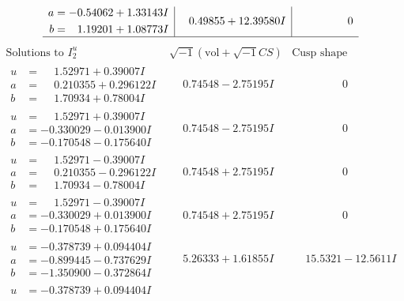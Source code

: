 \documentclass[1p]{elsarticle_modified}
\theoremstyle{definition}
\newcommand{\I}{\sqrt{-1}}
\begin{document}
$$\begin{array}{c|c|c}
\begin{aligned}
a &= -0.54062 + 1.33143 I \\
b &= \phantom{-}1.19201 + 1.08773 I\end{aligned}
 & \phantom{-}0.49855 + 12.39580 I & \phantom{-0.000000 } 0\\
 \hline 
 \end{array}$$\newpage$$\begin{array}{c|c|c}  
\text{Solutions to }I^u_{2}& \I (\text{vol} + \sqrt{-1}CS) & \text{Cusp shape}\\
 \hline 
\begin{aligned}
u &= \phantom{-}1.52971 + 0.39007 I \\
a &= \phantom{-}0.210355 + 0.296122 I \\
b &= \phantom{-}1.70934 + 0.78004 I\end{aligned}
 & \phantom{-}0.74548 - 2.75195 I & \phantom{-0.000000 } 0 \\ \hline\begin{aligned}
u &= \phantom{-}1.52971 + 0.39007 I \\
a &= -0.330029 - 0.013900 I \\
b &= -0.170548 - 0.175640 I\end{aligned}
 & \phantom{-}0.74548 - 2.75195 I & \phantom{-0.000000 } 0 \\ \hline\begin{aligned}
u &= \phantom{-}1.52971 - 0.39007 I \\
a &= \phantom{-}0.210355 - 0.296122 I \\
b &= \phantom{-}1.70934 - 0.78004 I\end{aligned}
 & \phantom{-}0.74548 + 2.75195 I & \phantom{-0.000000 } 0 \\ \hline\begin{aligned}
u &= \phantom{-}1.52971 - 0.39007 I \\
a &= -0.330029 + 0.013900 I \\
b &= -0.170548 + 0.175640 I\end{aligned}
 & \phantom{-}0.74548 + 2.75195 I & \phantom{-0.000000 } 0 \\ \hline\begin{aligned}
u &= -0.378739 + 0.094404 I \\
a &= -0.899445 - 0.737629 I \\
b &= -1.350900 - 0.372864 I\end{aligned}
 & \phantom{-}5.26333 + 1.61855 I & \phantom{-}15.5321 - 12.5611 I \\ \hline\begin{aligned}
u &= -0.378739 + 0.094404 I \\

\end{aligned}
\end{array}$$
\end{document}
